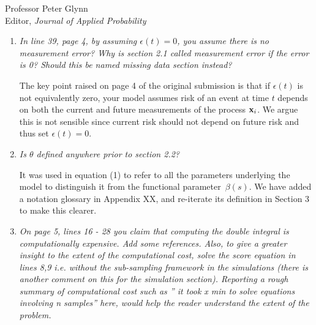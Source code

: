 \documentclass[11pt]{letter} %
\begin{document}
\begin{letter}{Professor
	Peter Glynn\\
	Editor, {\em Journal of Applied Probability}}
\begin{enumerate}
\item {\it In line 39, page 4, by assuming $\epsilon(t) = 0$, you assume there is no measurement error? Why is section 2.1 called measurement error if the error is 0? Should this be named missing data section instead?}

\vspace{5mm}
The key point raised on page 4 of the original submission is that if $\epsilon(t)$ is not equivalently zero, your model assumes risk of an event at time $t$ depends on both the current and future measurements of the process ${\bf x}_i$. We argue this is not sensible since current risk should not depend on future risk and thus set $\epsilon(t) = 0$.
\vspace{5mm}

\item  {\it Is $\theta$ defined anywhere prior to section 2.2?}

\vspace{5mm}
It was used in equation (1) to refer to all the parameters underlying the model to distinguish it from the functional parameter~$\beta (s)$. We have added a notation glossary in Appendix XX, and re-iterate its definition in Section 3 to make this clearer.
\vspace{5mm}

\item {\it On page 5, lines 16 - 28 you claim that computing the double integral is computationally expensive. Add some references. Also, to give a greater insight to the extent of the computational cost, solve the score equation in lines 8,9 i.e. without the sub-sampling framework in the simulations (there is another comment on this for the simulation section). Reporting a rough summary of computational cost such as ” it took x min to solve equations involving n samples” here, would help the reader understand
the extent of the problem.}


\end{enumerate}
\end{letter}
\end{document}
